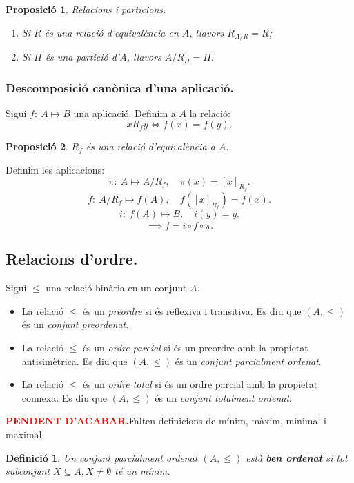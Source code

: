 \documentclass[11pt]{article}
\newtheorem{defi}{Definició}[section]
\newtheorem{prop}{Proposició}[section]
\newcommand{\pendent}{\textcolor{red}{\textbf{PENDENT D'ACABAR.}}}
\begin{document}
\begin{prop} Relacions i particions.
\begin{enumerate}
	\item Si $R$ és una relació d'equivalència en $A$, llavors $R_{A/R}=R$;
	\item Si $\Pi$ és una partició d'$A$, llavors $A/R_\Pi=\Pi.$
\end{enumerate}
\end{prop}
\subsubsection{Descomposició canònica d'una aplicació.}
Sigui $f:\ A\mapsto B$ una aplicació. Definim a $A$ la relació:
$$xR_fy\iff f(x)=f(y).$$
\begin{prop}
$R_f$ és una relació d'equivalència a $A$.
\end{prop}
\noindent Definim les aplicacions:
\begin{equation}
\pi:\ A\mapsto A/R_f,\quad\pi(x)=[x]_{R_f}.
\end{equation}
\begin{equation}
\bar{f}:\ A/R_f\mapsto f(A),\quad\bar{f}([x]_{R_f})=f(x).
\end{equation}
\begin{equation}
i:\ f(A)\mapsto B,\quad i(y)=y.
\end{equation}
$$\implies f=i\circ\bar{f}\circ\pi.$$
\subsection{Relacions d'ordre.}
Sigui $\leq$ una relació binària en un conjunt $A$.
\begin{itemize}
	\item La relació $\leq$ és un \textit{preordre} si és reflexiva i transitiva. Es diu que $(A,\leq)$ és un \textit{conjunt preordenat}.
	\item La relació $\leq$ és un \textit{ordre parcial} si és un preordre amb la propietat antisimètrica. Es diu que $(A,\leq)$ és un \textit{conjunt parcialment ordenat}.
	\item La relació $\leq$ és un \textit{ordre total} si és un ordre parcial amb la propietat connexa. Es diu que $(A,\leq)$ és un \textit{conjunt totalment ordenat}.
\end{itemize}
\pendent Falten definicions de mínim, màxim, minimal i maximal.
\noindent
\begin{defi}
Un conjunt parcialment ordenat $(A,\leq)$ està \textbf{ben ordenat} si tot subconjunt $X\subseteq A,X\neq\emptyset$ té un mínim.
\end{defi}
\end{document}
